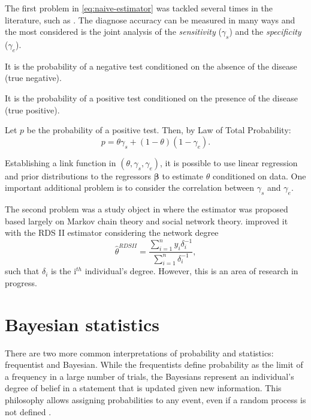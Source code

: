 The first problem in \eqref{eq:naive-estimator} was tackled several times in
the literature, such as \cite{mcinturff2004modelling}. The diagnose accuracy
can be measured in many ways and the most considered is the joint analysis of
the {\em sensitivity} ($\gamma_s$) and the {\em specificity}
($\gamma_e$). 

\begin{definition}[Specificity]
    It is the probability of a negative test conditioned on the absence of the
    disease (true negative).
\end{definition}

\begin{definition}[Sensitivity]
    It is the probability of a positive test conditioned on the presence of
    the disease (true positive). 
\end{definition}

Let $p$ be the probability of a positive test. Then, by Law of Total
Probability: 
\begin{equation}
    p = \theta\gamma_s + (1-\theta)(1-\gamma_e).    
\end{equation}

Establishing a link function in $(\theta, \gamma_s, \gamma_e)$, it is possible
to use linear regression and prior distributions to the regressors
$\boldsymbol{\beta}$ to estimate $\theta$ conditioned on data. One important
additional problem is to consider the correlation between $\gamma_s$ and $\gamma_e$. 


The second problem was a study object in \cite{heckathorn1997,heckathorn2002} where the estimator was proposed
based largely on Markov chain theory and social network theory.
\cite{volz2008probability} improved it with the RDS II estimator considering
the network degree
\begin{equation}
    \hat{\theta}^{RDS II} = \frac{\sum_{i=1}^n y_i \delta_i^{-1}}{\sum_{i=1}^n \delta_i^{-1}},
\end{equation}
such that $\delta_i$ is the i$^{th}$ individual's degree. However, this is an
area of research in progress. 

\section{Bayesian statistics}

There are two more common interpretations of probability and statistics:
frequentist and Bayesian. While the frequentists define
probability as the limit of a frequency in a large number of trials, the
Bayesians represent an individual's degree of belief in a statement that is
updated given new information. This philosophy allows assigning probabilities
to any event, even if a random process is not defined \cite{statisticat2016laplacesdemon}. 

